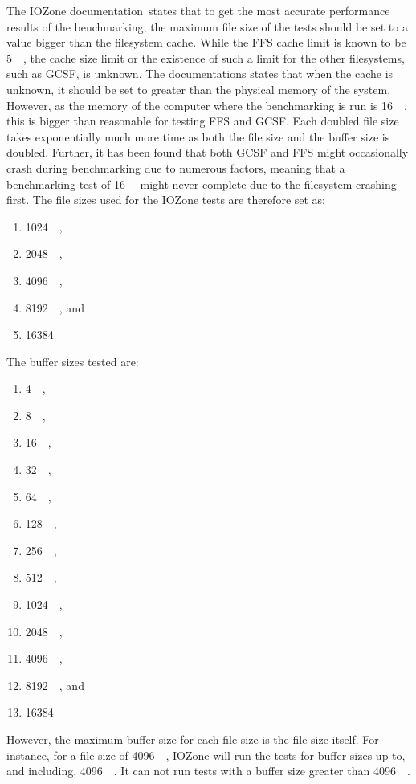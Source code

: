 The IOZone documentation\,\cite{iozoneIozoneFilesystemBenchmark} states that to get the most accurate performance results of the benchmarking, the maximum file size of the tests should be set to a value bigger than the filesystem cache. While the FFS cache limit is known to be \SI{5}{\mega\byte}, the cache size limit or the existence of such a limit for the other filesystems, such as GCSF, is unknown. The documentations states that when the cache is unknown, it should be set to greater than the physical memory of the system. However, as the memory of the computer where the benchmarking is run is \SI{16}{\giga\byte}, this is bigger than reasonable for testing FFS and GCSF. Each doubled file size takes exponentially much more time as both the file size and the buffer size is doubled. Further, it has been found that both GCSF and FFS might occasionally crash during benchmarking due to numerous factors, meaning that a benchmarking test of \SI{16}{\giga\byte} might never complete due to the filesystem crashing first. The file sizes used for the IOZone tests are therefore set as:
\begin{enumerate}
	\item \SI{1024}{\kilo\byte},
	\item \SI{2048}{\kilo\byte},
	\item \SI{4096}{\kilo\byte},
	\item \SI{8192}{\kilo\byte}, and
	\item \SI{16384}{\kilo\byte}
\end{enumerate}
The buffer sizes tested are:
\begin{enumerate}
	\item \SI{4}{\kilo\byte},
	\item \SI{8}{\kilo\byte},
	\item \SI{16}{\kilo\byte},
	\item \SI{32}{\kilo\byte},
	\item \SI{64}{\kilo\byte},
	\item \SI{128}{\kilo\byte},
	\item \SI{256}{\kilo\byte},
	\item \SI{512}{\kilo\byte},
	\item \SI{1024}{\kilo\byte},
	\item \SI{2048}{\kilo\byte},
	\item \SI{4096}{\kilo\byte},
	\item \SI{8192}{\kilo\byte}, and
	\item \SI{16384}{\kilo\byte}
\end{enumerate}
However, the maximum buffer size for each file size is the file size itself. For instance, for a file size of \SI{4096}{\kilo\byte}, IOZone will run the tests for buffer sizes up to, and including, \SI{4096}{\kilo\byte}. It can not run tests with a buffer size greater than \SI{4096}{\kilo\byte}.

